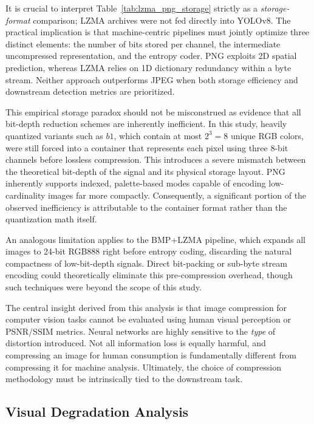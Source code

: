 \documentclass[12pt, a4paper]{article}
\begin{document}
It is crucial to interpret Table~\ref{tab:lzma_png_storage} strictly as a \textit{storage-format} comparison; LZMA archives were not fed directly into YOLOv8. The practical implication is that machine-centric pipelines must jointly optimize three distinct elements: the number of bits stored per channel, the intermediate uncompressed representation, and the entropy coder. PNG exploits 2D spatial prediction, whereas LZMA relies on 1D dictionary redundancy within a byte stream. Neither approach outperforms JPEG when both storage efficiency and downstream detection metrics are prioritized.

This empirical storage paradox should not be misconstrued as evidence that all bit-depth reduction schemes are inherently inefficient. In this study, heavily quantized variants such as $b1$, which contain at most $2^3=8$ unique RGB colors, were still forced into a container that represents each pixel using three 8-bit channels before lossless compression. This introduces a severe mismatch between the theoretical bit-depth of the signal and its physical storage layout. PNG inherently supports indexed, palette-based modes capable of encoding low-cardinality images far more compactly. Consequently, a significant portion of the observed inefficiency is attributable to the container format rather than the quantization math itself. 

An analogous limitation applies to the BMP+LZMA pipeline, which expands all images to 24-bit RGB888 right before entropy coding, discarding the natural compactness of low-bit-depth signals. Direct bit-packing or sub-byte stream encoding could theoretically eliminate this pre-compression overhead, though such techniques were beyond the scope of this study.

The central insight derived from this analysis is that image compression for computer vision tasks cannot be evaluated using human visual perception or PSNR/SSIM metrics. Neural networks are highly sensitive to the \textit{type} of distortion introduced. Not all information loss is equally harmful, and compressing an image for human consumption is fundamentally different from compressing it for machine analysis. Ultimately, the choice of compression methodology must be intrinsically tied to the downstream task.



\subsection{Visual Degradation Analysis}
\end{document}
